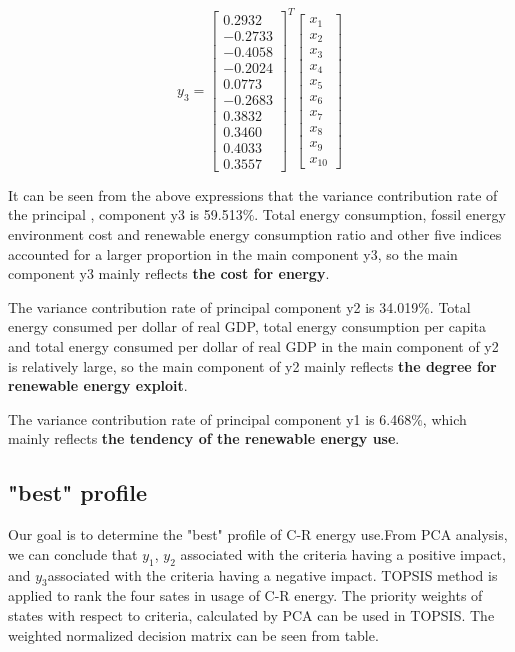 \documentclass{mcmthesis}
\begin{document}
\begin{enumerate}
\begin{table}[!hbpt]
          $${ y }_{ 3 }={ \begin{bmatrix} 0.2932 \\ -0.2733 \\ -0.4058 \\ -0.2024 \\ 0.0773 \\ -0.2683 \\0.3832 \\ 0.3460 \\ 0.4033 \\ 0.3557 \end{bmatrix} }^{ T }\begin{bmatrix} x_{ 1 } \\ x_{ 2 } \\ x_{ 3 } \\ x_{ 4 } \\ x_{ 5 } \\ x_{ 6 } \\ x_{ 7 } \\ x_{ 8 } \\ x_{ 9 } \\ x_{ 10 } \end{bmatrix}$$
             \end{table}
            It can be seen from the above expressions that the variance contribution rate of the principal , component y3 is 59.513$\%$. Total energy consumption, fossil energy environment cost and renewable energy consumption ratio and other five indices accounted for a larger proportion in the main component y3, so the main component y3 mainly reflects \textbf{the cost for energy}.

            The variance contribution rate of principal component y2 is 34.019$\%$.  Total energy consumed per dollar of real GDP, total energy consumption per capita and total energy consumed per dollar of real GDP in the main component of y2 is relatively large, so the main component of y2 mainly reflects \textbf{the degree for renewable energy exploit}.

            The variance contribution rate of principal component y1 is 6.468$\%$, which mainly reflects \textbf{the tendency of the renewable energy use}.
        \end{enumerate}

\subsection{"best" profile}

       Our goal is to determine the "best" profile of C-R energy use.From PCA analysis, we can conclude that $y_{1}$, $y_{2}$ associated with the criteria having a positive impact, and $y_{3}$associated with the criteria having a negative  impact.
      TOPSIS method is applied to rank the four sates in usage of C-R energy. The priority weights of states with respect to criteria, calculated by PCA can be used in TOPSIS. The weighted normalized decision matrix can be seen from table.
\end{document}

